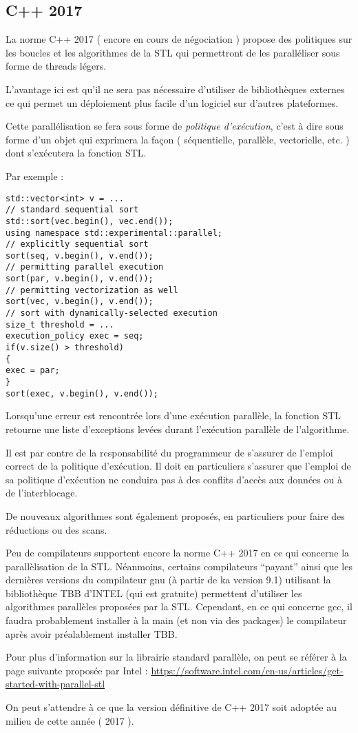 \documentclass[fleqn,11pt]{article}
\begin{document}
\subsection{C++ 2017}

La norme C++ 2017 ( encore en cours de négociation ) propose des politiques sur les boucles
et les algorithmes de la STL qui permettront de les paralléliser sous forme de threads légers.

L'avantage ici est qu'il ne sera pas nécessaire d'utiliser de bibliothèques externes ce qui permet un
déploiement plus facile d'un logiciel sur d'autres plateformes.

Cette parallélisation se fera sous forme de \textsl{politique d'exécution}, c'est à dire sous
forme d'un objet qui exprimera la façon ( séquentielle, parallèle, vectorielle, etc. ) dont
s'exécutera la fonction STL.

Par exemple :
\begin{lstlisting}
std::vector<int> v = ...
// standard sequential sort
std::sort(vec.begin(), vec.end());
using namespace std::experimental::parallel;
// explicitly sequential sort
sort(seq, v.begin(), v.end());
// permitting parallel execution
sort(par, v.begin(), v.end());
// permitting vectorization as well
sort(vec, v.begin(), v.end());
// sort with dynamically-selected execution
size_t threshold = ...
execution_policy exec = seq;
if(v.size() > threshold)
{
exec = par;
}
sort(exec, v.begin(), v.end());
\end{lstlisting}

Lorsqu'une erreur est rencontrée lors d'une exécution parallèle, la fonction STL retourne
une liste d'exceptions levées durant l'exécution parallèle de l'algorithme.

Il est par contre de la responsabilité du programmeur de s'assurer de l'emploi correct de la politique
d'exécution. Il doit en particuliers s'assurer que l'emploi de sa politique d'exécution ne conduira pas
à des conflits d'accès aux données ou à de l'interblocage.

De nouveaux algorithmes sont également proposés, en particuliers pour faire des réductions ou des
scans.

Peu de compilateurs supportent encore la norme C++ 2017 en ce qui concerne la parallèlisation de la STL.
Néanmoins, certains compilateurs ``payant'' ainsi que les dernières versions du compilateur gnu (à partir de ka version 9.1)
utilisant la bibliothèque TBB d'INTEL (qui est gratuite)  permettent d'utiliser les algorithmes parallèles
proposées par la STL. Cependant, en ce qui concerne gcc, il faudra probablement installer à la main (et non
via des packages) le compilateur après avoir préalablement installer TBB.

Pour plus d'information sur la librairie standard parallèle, on peut se référer à la page suivante proposée
par Intel :
\url{https://software.intel.com/en-us/articles/get-started-with-parallel-stl}


On peut s'attendre à ce que la version définitive de C++ 2017 soit adoptée au milieu
de cette année ( 2017 ).
\end{document}
